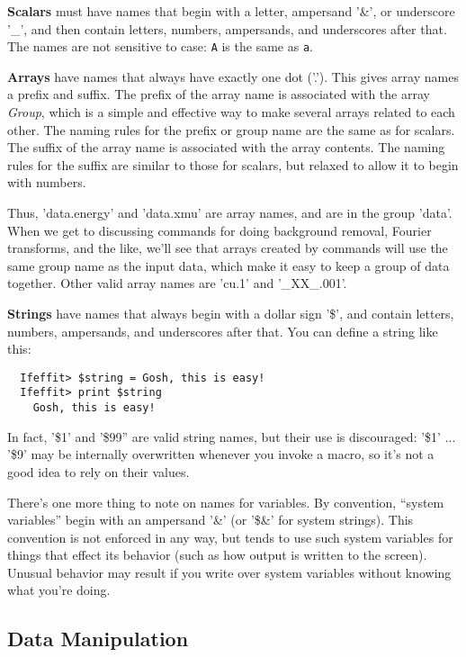 \documentclass[11pt]{article}
\begin{document}
{\bf{Scalars}} must have names that begin with a letter, ampersand '\&', or
underscore '\_', and then contain letters, numbers, ampersands, and
underscores after that.  The names are not sensitive to case: {\tt{A}} is
the same as {\tt{a}}.


{\bf{Arrays}} have names that always have exactly one dot ('.').  This
gives array names a prefix and suffix.  The prefix of the array name is
associated with the array {\emph{Group}}, which is a simple and effective
way to make several arrays related to each other.  The naming rules for the
prefix or group name are the same as for scalars.  The suffix of the array
name is associated with the array contents.  The naming rules for the
suffix are similar to those for scalars, but relaxed to allow it to begin
with numbers.

Thus, 'data.energy' and 'data.xmu' are array names, and are in the group
'data'.  When we get to discussing commands for doing background removal,
Fourier transforms, and the like, we'll see that arrays created by
{\ifeffit} commands will use the same group name as the input data, which
make it easy to keep a group of data together.  Other valid array names are
'cu.1' and '\_XX\_.001'.

{\bf{Strings}} have names that always begin with a dollar sign '\$', and
contain letters, numbers, ampersands, and underscores after that.  You can
define a string like this:
{\small\begin{verbatim}
  Ifeffit> $string = Gosh, this is easy!
  Ifeffit> print $string
    Gosh, this is easy!
\end{verbatim}}\noindent
In fact, '\$1' and '\$99'' are valid string names, but their use is
discouraged: '\$1' ... '\$9' may be internally overwritten whenever you
invoke a macro, so it's not a good idea to rely on their values.

There's one more thing to note on names for variables.  By convention,
``system variables'' begin with an ampersand '\&' (or '\$\&' for system
strings).  This convention is not enforced in any way, but {\ifeffit} tends
to use such system variables for things that effect its behavior (such as
how output is written to the screen).  Unusual behavior may result if you
write over system variables without knowing what you're doing.

\subsection{Data Manipulation}\label{s:datatypes:manip}
\end{document}

